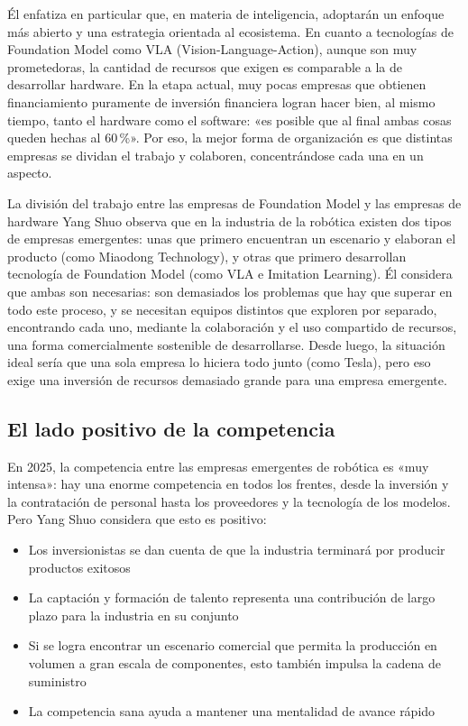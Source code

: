 Él enfatiza en particular que, en materia de inteligencia, adoptarán un enfoque más abierto y una estrategia orientada al ecosistema. En cuanto a tecnologías de Foundation Model como VLA (Vision-Language-Action), aunque son muy prometedoras, la cantidad de recursos que exigen es comparable a la de desarrollar hardware. En la etapa actual, muy pocas empresas que obtienen financiamiento puramente de inversión financiera logran hacer bien, al mismo tiempo, tanto el hardware como el software: «es posible que al final ambas cosas queden hechas al 60\,\%». Por eso, la mejor forma de organización es que distintas empresas se dividan el trabajo y colaboren, concentrándose cada una en un aspecto.

\begin{knowledgebox}{La división del trabajo entre las empresas de Foundation Model y las empresas de hardware}
Yang Shuo observa que en la industria de la robótica existen dos tipos de empresas emergentes: unas que primero encuentran un escenario y elaboran el producto (como Miaodong Technology), y otras que primero desarrollan tecnología de Foundation Model (como VLA e Imitation Learning). Él considera que ambas son necesarias: son demasiados los problemas que hay que superar en todo este proceso, y se necesitan equipos distintos que exploren por separado, encontrando cada uno, mediante la colaboración y el uso compartido de recursos, una forma comercialmente sostenible de desarrollarse. Desde luego, la situación ideal sería que una sola empresa lo hiciera todo junto (como Tesla), pero eso exige una inversión de recursos demasiado grande para una empresa emergente.
\end{knowledgebox}

\subsection{El lado positivo de la competencia}

En 2025, la competencia entre las empresas emergentes de robótica es «muy intensa»: hay una enorme competencia en todos los frentes, desde la inversión y la contratación de personal hasta los proveedores y la tecnología de los modelos. Pero Yang Shuo considera que esto es positivo:

\begin{itemize}
    \item Los inversionistas se dan cuenta de que la industria terminará por producir productos exitosos
    \item La captación y formación de talento representa una contribución de largo plazo para la industria en su conjunto
    \item Si se logra encontrar un escenario comercial que permita la producción en volumen a gran escala de componentes, esto también impulsa la cadena de suministro
    \item La competencia sana ayuda a mantener una mentalidad de avance rápido
\end{itemize}

